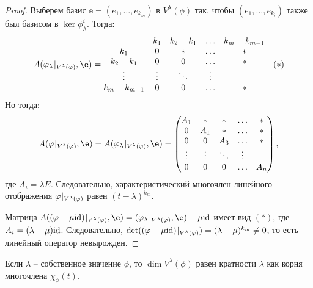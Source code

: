 \begin{proof}
	Выберем базис $\mathbb{e} = (e_1, \ldots, e_{k_m})$ в $V^{\lambda}(\phi)$ так, чтобы
	$(e_1, \ldots, e_{k_i})$ также был базисом в  $\ker\phi^{i}_\lambda$. Тогда:
	\begin{gather*}
	A(\limref{\phi_\l}{V^\l(\phi)}, \e) = 
	\begin{matrix}
	  		 & k_1 & k_2 - k_1 & \ldots & k_m - k_{m - 1}\\
	  		k_1 & 0 & * & \ldots & * \\
			k_2 - k_1 & 0 & 0 & \ldots & * \\
	  		\vdots &\vdots &\ddots &\vdots\\
	  		k_m - k_{m - 1} & 0 & 0 &\ldots & *
	\end{matrix} 	\quad (*)
	\end{gather*}
	Но тогда:
	\begin{gather*}
	A(\limref{\phi}{V^\l(\phi)}, \e) = A(\limref{\phi_\l}{V^\l(\phi)}, \e) =
	\begin{pmatrix}
  		A_1 & * & * & \ldots & * \\
  		0 & A_1 & * & \ldots & * \\
		0 & 0 & A_3 & \ldots & * \\
  		\vdots &\vdots &\ddots &\vdots\\
  		0 & 0 & 0 &\ldots & A_n
 	\end{pmatrix},
	\end{gather*}
	где $A_i = \lambda E$. Следовательно, характеристический многочлен линейного отображения ${\varphi}\negmedspace\mid_{V^\lambda(\varphi)}$ равен $(t - \lambda)^{k_m}$.
	
	Матрица $A(\limref{(\phi - \mu\id)}{V^\l(\phi)}, \e) = (\limref{\phi_\l}{V^\l(\phi)}, \e) - \mu\id$ имеет вид $(*)$, где $A_i = (\lambda - \mu)\mathrm{id}$. Следовательно,
	$\det({(\varphi - \mu \mathrm{id})}\negmedspace\mid_{V^\lambda(\varphi)}) = (\lambda - \mu)^{k_m} \neq 0$, то есть линейный оператор невырожден.
\end{proof}

\begin{Suggestion}
	Если $\lambda$ -- собственное значение $\phi$, то $\dim{V^{\lambda}(\phi)}$ равен кратности 
	$\lambda$ как корня многочлена $\chi_\phi(t)$.
\end{Suggestion}

